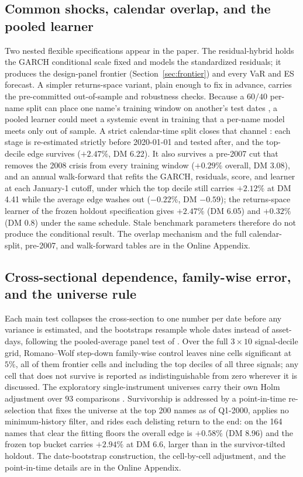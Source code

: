 \documentclass[11pt]{article}
\theoremstyle{remark}
\begin{document}
\subsection{Common shocks, calendar overlap, and the pooled learner}
\label{sec:calendarleak}

Two nested flexible specifications appear in the paper. The
residual-hybrid holds the GARCH conditional scale fixed and models the
standardized residuals; it produces the design-panel frontier
(Section~\ref{sec:frontier}) and every VaR and ES forecast. A simpler
returns-space variant, plain enough to fix in advance, carries the
pre-committed out-of-sample and robustness checks. Because a $60/40$
per-name split can place one name's training window on another's test
dates \citep{lopezdeprado2018}, a pooled learner could meet a systemic
event in training that a per-name model meets only out of sample. A
strict calendar-time split closes that channel \citep{gukellyxiu2020}:
each stage is re-estimated strictly before 2020-01-01 and tested after,
and the top-decile edge survives ($+2.47\%$, DM 6.22). It also survives a
pre-2007 cut that removes the 2008 crisis from every training window
($+0.29\%$ overall, DM 3.08), and an annual walk-forward that refits the
GARCH, residuals, score, and learner at each January-1 cutoff, under
which the top decile still carries $+2.12\%$ at DM 4.41 while the average
edge washes out ($-0.22\%$, DM $-0.59$); the returns-space learner of the frozen holdout specification gives $+2.47\%$ (DM 6.05) and $+0.32\%$ (DM 0.8) under the same schedule. Stale benchmark parameters therefore do not
produce the conditional result. The overlap mechanism and the full
calendar-split, pre-2007, and walk-forward tables are in the Online
Appendix.

\subsection{Cross-sectional dependence, family-wise error, and the
universe rule}
\label{sec:fwer}

Each main test collapses the cross-section to one number per date before
any variance is estimated, and the bootstraps resample whole dates instead of
asset-days, following the pooled-average panel test of
\citet{qutimmermannzhu2024}. Over the full $3\times10$ signal-decile
grid, Romano--Wolf step-down family-wise control
\citep{romanowolf2005, romanowolf2016} leaves nine cells significant at
$5\%$, all of them frontier cells and including the top deciles of all
three signals; any cell that does not survive is reported as
indistinguishable from zero wherever it is discussed. The exploratory
single-instrument universes carry their own Holm adjustment over 93
comparisons \citep{holm1979}. Survivorship is addressed by a
point-in-time re-selection that fixes the universe at the top 200 names
as of Q1-2000, applies no minimum-history filter, and rides each
delisting return to the end: on the 164 names that clear the fitting
floors the overall edge is $+0.58\%$ (DM 8.96) and the frozen top bucket
carries $+2.94\%$ at DM 6.6, larger than in the survivor-tilted holdout.
The date-bootstrap construction, the cell-by-cell adjustment, and the
point-in-time details are in the Online Appendix.
\end{document}
